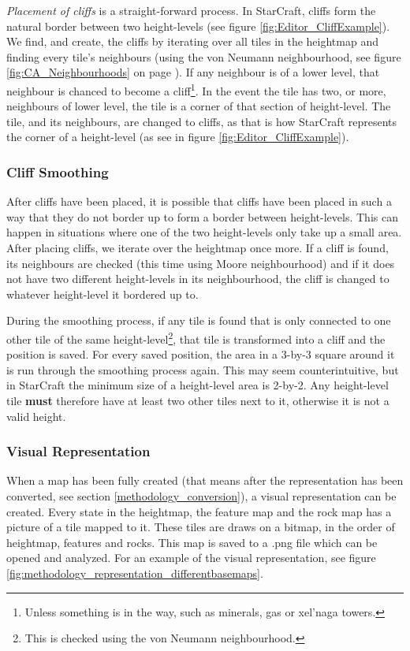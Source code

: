 \textit{Placement of cliffs} is a straight-forward process. In StarCraft, cliffs form the natural border between two height-levels (see figure \ref{fig:Editor_CliffExample}). We find, and create, the cliffs by iterating over all tiles in the heightmap and finding every tile's neighbours (using the von Neumann neighbourhood, see figure \ref{fig:CA_Neighbourhoods} on page \pageref{fig:CA_Neighbourhoods}). If any neighbour is of a lower level, that neighbour is chanced to become a cliff\footnote{Unless something is in the way, such as minerals, gas or xel'naga towers.}. In the event the tile has two, or more, neighbours of lower level, the tile is a corner of that section of height-level. The tile, and its neighbours, are changed to cliffs, as that is how StarCraft represents the corner of a height-level (as see in figure \ref{fig:Editor_CliffExample}).


\subsubsection{Cliff Smoothing}

After cliffs have been placed, it is possible that cliffs have been placed in such a way that they do not border up to form a border between height-levels. This can happen in situations where one of the two height-levels only take up a small area. After placing cliffs, we iterate over the heightmap once more. If a cliff is found, its neighbours are checked (this time using Moore neighbourhood) and if it does not have two different height-levels in its neighbourhood, the cliff is changed to whatever height-level it bordered up to. 

During the smoothing process, if any tile is found that is only connected to one other tile of the same height-level\footnote{This is checked using the von Neumann neighbourhood.}, that tile is transformed into a cliff and the position is saved. For every saved position, the area in a 3-by-3 square around it is run through the smoothing process again. This may seem counterintuitive, but in StarCraft the minimum size of a height-level area is 2-by-2. Any height-level tile \textbf{must} therefore have at least two other tiles next to it, otherwise it is not a valid height.

\subsubsection{Visual Representation}
When a map has been fully created (that means after the representation has been converted, see section \ref{methodology_conversion}), a visual representation can be created. Every state in the heightmap, the feature map and the rock map has a picture of a tile mapped to it. These tiles are draws on a bitmap, in the order of heightmap, features and rocks. This map is saved to a .png file which can be opened and analyzed. For an example of the visual representation, see figure \ref{fig:methodology_representation_differentbasemaps}.